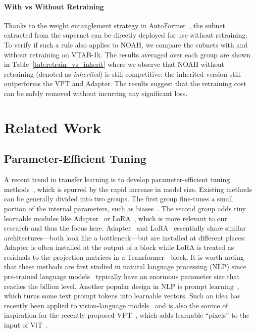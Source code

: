 \paragraph{With vs Without Retraining} Thanks to the weight entanglement strategy in AutoFormer~\cite{chen2021autoformer}, the subnet extracted from the supernet can be directly deployed for use without retraining. To verify if such a rule also applies to NOAH, we compare the subnets with and without retraining on VTAB-1k. The results averaged over each group are shown in Table~\ref{tab:retrain_vs_inherit} where we observe that NOAH without retraining (denoted as \emph{inherited}) is still competitive: the inherited version still outperforms the VPT and Adapter. The results suggest that the retraining cost can be safely removed without incurring any significant loss.

\section{Related Work}

\subsection{Parameter-Efficient Tuning} A recent trend in transfer learning is to develop parameter-efficient tuning methods~\cite{jia2022visual,houlsby2019parameter,hu2021lora,he2021towards,zhong2021factual,zhou2021learning}, which is spurred by the rapid increase in model size. Existing methods can be generally divided into two groups. The first group fine-tunes a small portion of the internal parameters, such as biases~\cite{zaken2021bitfit}. The second group adds tiny learnable modules like Adapter~\cite{houlsby2019parameter} or LoRA~\cite{hu2021lora}, which is more relevant to our research and thus the focus here. Adapter~\cite{houlsby2019parameter} and LoRA~\cite{hu2021lora} essentially share similar architectures---both look like a bottleneck---but are installed at different places: Adapter is often installed at the output of a block while LoRA is treated as residuals to the projection matrices in a Transformer~\cite{vaswani2017attention} block. It is worth noting that these methods are first studied in natural language processing (NLP) since pre-trained language models~\cite{devlin2018bert,brown2020language} typically have an enormous parameter size that reaches the billion level. Another popular design in NLP is prompt learning~\cite{zhong2021factual,li2021prefix,lester2021power}, which turns some text prompt tokens into learnable vectors. Such an idea has recently been applied to vision-language models~\cite{zhou2021learning,zhou2022conditional,lu2022prompt} and is also the source of inspiration for the recently proposed VPT~\cite{jia2022visual}, which adds learnable ``pixels'' to the input of ViT~\cite{dosovitskiy2020image}.

